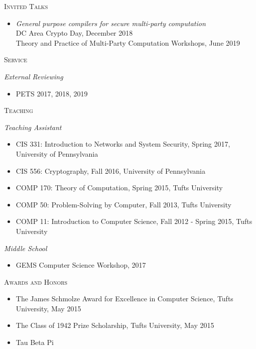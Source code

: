 \documentclass{article}
\begin{document}
\textsc{Invited Talks}
\begin{itemize}[label={}]
\item \emph{General purpose compilers for secure multi-party computation}\\
  DC Area Crypto Day, December 2018 \\
  Theory and Practice of Multi-Party Computation Workshops, June 2019
\end{itemize}

\textsc{Service}

\textit{External Reviewing}
\begin{itemize}[label={}]
\item PETS 2017, 2018, 2019
\end{itemize}

\textsc{Teaching}

\textit{Teaching Assistant}
\begin{itemize}[label={},noitemsep]
\item CIS 331: Introduction to Networks and System Security, Spring 2017, University of Pennsylvania
\item CIS 556: Cryptography, Fall 2016, University of Pennsylvania
\item COMP 170: Theory of Computation, Spring 2015, Tufts University
\item COMP 50: Problem-Solving by Computer, Fall 2013, Tufts University
\item COMP 11: Introduction to Computer Science, Fall 2012 - Spring 2015, Tufts University
\end{itemize}

\textit{Middle School}
\begin{itemize}[label={},noitemsep]
\item GEMS Computer Science Workshop, 2017
\end{itemize}

\textsc{Awards and Honors}
\begin{itemize}[label={},noitemsep]
\item The James Schmolze Award for Excellence in Computer Science, Tufts University, May 2015
\item The Class of 1942 Prize Scholarship, Tufts University, May 2015
\item Tau Beta Pi
\end{itemize}
\end{document}
